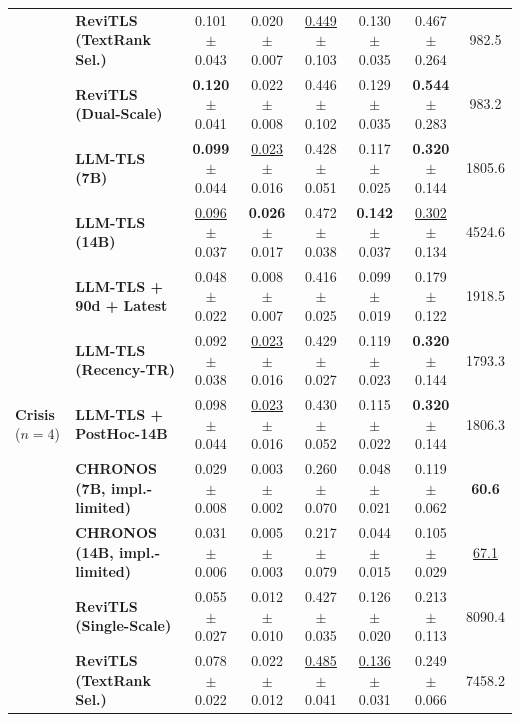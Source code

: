 \documentclass[journal]{IEEEtran}
\begin{document}
\begin{table}[t]
{\begin{tabular}{@{}llcccccc@{}}
  & \textbf{ReviTLS (TextRank Sel.)} & 0.101{\tiny$\pm$0.043} & 0.020{\tiny$\pm$0.007} & \underline{0.449}{\tiny$\pm$0.103} & 0.130{\tiny$\pm$0.035} & 0.467{\tiny$\pm$0.264} & 982.5 \\
  & \textbf{ReviTLS (Dual-Scale)} & \textbf{0.120}{\tiny$\pm$0.041} & 0.022{\tiny$\pm$0.008} & 0.446{\tiny$\pm$0.102} & 0.129{\tiny$\pm$0.035} & \textbf{0.544}{\tiny$\pm$0.283} & 983.2 \\
\midrule
\multirow{10}{*}{\textbf{Crisis} ($n=4$)}
  & \textbf{LLM-TLS (7B)}~\cite{hu2024moments} & \textbf{0.099}{\tiny$\pm$0.044} & \underline{0.023}{\tiny$\pm$0.016} & 0.428{\tiny$\pm$0.051} & 0.117{\tiny$\pm$0.025} & \textbf{0.320}{\tiny$\pm$0.144} & 1805.6 \\
  & \textbf{LLM-TLS (14B)} & \underline{0.096}{\tiny$\pm$0.037} & \textbf{0.026}{\tiny$\pm$0.017} & 0.472{\tiny$\pm$0.038} & \textbf{0.142}{\tiny$\pm$0.037} & \underline{0.302}{\tiny$\pm$0.134} & 4524.6 \\
  & \textbf{LLM-TLS + 90d + Latest} & 0.048{\tiny$\pm$0.022} & 0.008{\tiny$\pm$0.007} & 0.416{\tiny$\pm$0.025} & 0.099{\tiny$\pm$0.019} & 0.179{\tiny$\pm$0.122} & 1918.5 \\
  & \textbf{LLM-TLS (Recency-TR)} & 0.092{\tiny$\pm$0.038} & \underline{0.023}{\tiny$\pm$0.016} & 0.429{\tiny$\pm$0.027} & 0.119{\tiny$\pm$0.023} & \textbf{0.320}{\tiny$\pm$0.144} & 1793.3 \\
  & \textbf{LLM-TLS + PostHoc-14B} & 0.098{\tiny$\pm$0.044} & \underline{0.023}{\tiny$\pm$0.016} & 0.430{\tiny$\pm$0.052} & 0.115{\tiny$\pm$0.022} & \textbf{0.320}{\tiny$\pm$0.144} & 1806.3 \\
  & \textbf{CHRONOS (7B, impl.-limited)}~\cite{wu2025unfolding} & 0.029{\tiny$\pm$0.008} & 0.003{\tiny$\pm$0.002} & 0.260{\tiny$\pm$0.070} & 0.048{\tiny$\pm$0.021} & 0.119{\tiny$\pm$0.062} & \textbf{60.6} \\
  & \textbf{CHRONOS (14B, impl.-limited)} & 0.031{\tiny$\pm$0.006} & 0.005{\tiny$\pm$0.003} & 0.217{\tiny$\pm$0.079} & 0.044{\tiny$\pm$0.015} & 0.105{\tiny$\pm$0.029} & \underline{67.1} \\
  & \textbf{ReviTLS (Single-Scale)} & 0.055{\tiny$\pm$0.027} & 0.012{\tiny$\pm$0.010} & 0.427{\tiny$\pm$0.035} & 0.126{\tiny$\pm$0.020} & 0.213{\tiny$\pm$0.113} & 8090.4 \\
  & \textbf{ReviTLS (TextRank Sel.)} & 0.078{\tiny$\pm$0.022} & 0.022{\tiny$\pm$0.012} & \underline{0.485}{\tiny$\pm$0.041} & \underline{0.136}{\tiny$\pm$0.031} & 0.249{\tiny$\pm$0.066} & 7458.2 \\

\end{tabular}}
\end{table}
\end{document}

